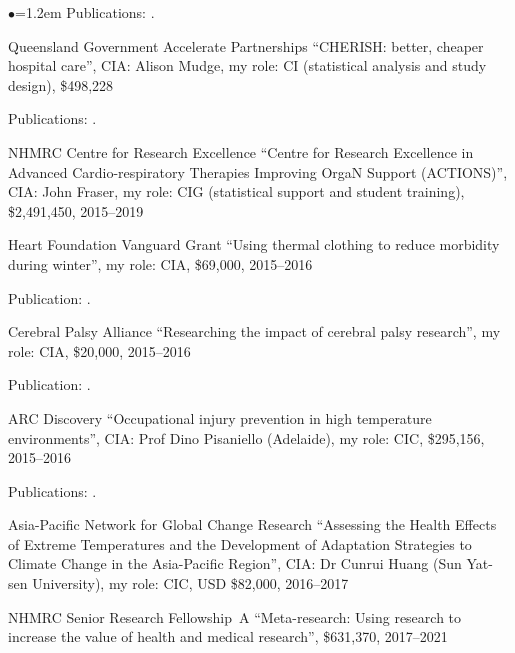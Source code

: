 \documentclass[a4paper,11pt]{article}
\renewcommand{\labelitemi}{$\bullet$}
\begin{document}
\begin{raggedright}
\begin{list}{\labelitemi}{\leftmargin=1.2em}
    Publications: .

\item Queensland Government Accelerate Partnerships ``CHERISH: better, cheaper hospital care'', CIA: Alison Mudge, my role: CI (statistical analysis and study design), \$498,228 %

    Publications: .

\item NHMRC Centre for Research Excellence ``Centre for Research Excellence in Advanced Cardio-respiratory Therapies Improving OrgaN Support (ACTIONS)'', CIA: John Fraser, my role: CIG (statistical support and student training), \$2,491,450, 2015--2019

\item Heart Foundation Vanguard Grant ``Using thermal clothing to reduce morbidity during winter'', my role: CIA, \$69,000, 2015--2016

   Publication: .

\item Cerebral Palsy Alliance ``Researching the impact of cerebral palsy research'', my role: CIA, \$20,000, 2015--2016

   Publication: .

\item ARC Discovery ``Occupational injury prevention in high temperature environments'', CIA: Prof Dino Pisaniello (Adelaide), my role: CIC, \$295,156, 2015--2016

   Publications: .

\item Asia-Pacific Network for Global Change Research ``Assessing the Health Effects of Extreme Temperatures and the Development of
Adaptation Strategies to Climate Change in the Asia-Pacific Region'', CIA: Dr Cunrui Huang (Sun Yat-sen University), my role: CIC, USD \$82,000, 2016--2017

\item NHMRC Senior Research Fellowship~A ``Meta-research: Using research to increase the value of health and medical research'', \$631,370, 2017--2021


\end{list}
\end{raggedright}
\end{document}
